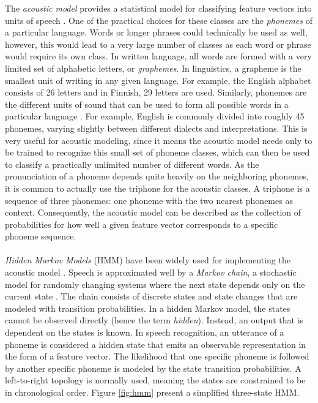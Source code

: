 \documentclass[english, 12pt, a4paper, pdftex, elec, utf8]{aaltothesis}
\begin{document}
The \textit{acoustic model} provides a statistical model for classifying feature vectors into units of speech \cite{kallasjoki2016}. One of the practical choices for these classes are the \textit{phonemes} of a particular language. Words or longer phrases could technically be used as well, however, this would lead to a very large number of classes as each word or phrase would require its own class. In written language, all words are formed with a very limited set of alphabetic letters, or \textit{graphemes}. In linguistics, a grapheme is the smallest unit of writing in any given language. For example, the English alphabet consists of 26 letters and in Finnish, 29 letters are used. Similarly, phonemes are the different units of sound that can be used to form all possible words in a particular language \cite[p.~24--25]{huang2001spoken}. For example, English is commonly divided into roughly 45 phonemes, varying slightly between different dialects and interpretations. This is very useful for acoustic modeling, since it means the acoustic model needs only to be trained to recognize this small set of phoneme classes, which can then be used to classify a practically unlimited number of different words. As the pronunciation of a phoneme depends quite heavily on the neighboring phonemes, it is common to actually use the triphone for the acoustic classes. A triphone is a sequence of three phonemes: one phoneme with the two nearest phonemes as context. Consequently, the acoustic model can be described as the collection of probabilities for how well a given feature vector corresponds to a specific phoneme sequence. \\\\
\textit{Hidden Markov Models} (HMM) have been widely used for implementing the acoustic model \cite{gales2008application, hori2013speech}. Speech is approximated well by a \textit{Markov chain}, a stochastic model for randomly changing systems where the next state depends only on the current state \cite[p.~23--26]{yu2014automatic}. The chain consists of discrete states and state changes that are modeled with transition probabilities. In a hidden Markov model, the states cannot be observed directly (hence the term \textit{hidden}). Instead, an output that is dependent on the states is known. In speech recognition, an utterance of a phoneme is considered a hidden state that emits an observable representation in the form of a feature vector. The likelihood that one specific phoneme is followed by another specific phoneme is modeled by the state transition probabilities. A left-to-right topology is normally used, meaning the states are constrained to be in chronological order. Figure \ref{fig:hmm} present a simplified three-state HMM.
\end{document}
